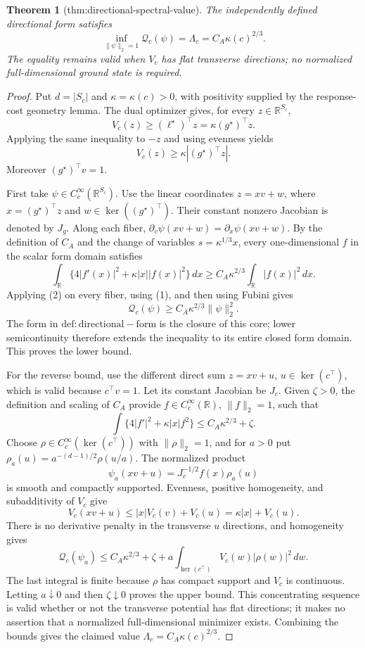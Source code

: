 \documentclass{article}
\newtheorem{theorem}{Theorem}
\begin{document}
\begin{theorem}[thm:directional-spectral-value]\label{thm:directional-spectral-value}
The independently defined directional form satisfies \[\inf_{\|\psi\|_2=1}\mathcal Q_c(\psi)=\Lambda_c=C_A\kappa(c)^{2/3}.\] The equality remains valid when \(V_c\) has flat transverse directions; no normalized full-dimensional ground state is required.
\end{theorem}
\begin{proof}
Put \(d=|S_c|\) and \(\kappa=\kappa(c)>0\), with positivity supplied by the response-cost geometry lemma.  The dual optimizer gives, for every \(z\in\mathbb R^{S_c}\),
\[
V_c(z)\ge (\ell^\star)^\top z=\kappa(g^\star)^\top z.
\]
Applying the same inequality to \(-z\) and using evenness yields
\[
V_c(z)\ge\kappa|(g^\star)^\top z|. \tag{1}
\]
Moreover \((g^\star)^\top v=1\).

First take \(\psi\in C_c^\infty(\mathbb R^{S_c})\).  Use the linear coordinates
\(z=xv+w\), where \(x=(g^\star)^\top z\) and \(w\in\ker((g^\star)^\top)\).  Their constant nonzero Jacobian is denoted by \(J_g\).  Along each fiber, \(\partial_v\psi(xv+w)=\partial_x\psi(xv+w)\).  By the definition of \(C_A\) and the change of variables \(s=\kappa^{1/3}x\), every one-dimensional \(f\) in the scalar form domain satisfies
\[
\int_{\mathbb R}\{4|f'(x)|^2+\kappa|x||f(x)|^2\}\,dx
\ge C_A\kappa^{2/3}\int_{\mathbb R}|f(x)|^2\,dx. \tag{2}
\]
Applying (2) on every fiber, using (1), and then using Fubini gives
\[
\mathcal Q_c(\psi)
\ge C_A\kappa^{2/3}\|\psi\|_2^2.
\]
The form in \(\mathrm{def:directional-form}\) is the closure of this core; lower semicontinuity therefore extends the inequality to its entire closed form domain.  This proves the lower bound.

For the reverse bound, use the different direct sum
\(z=xv+u\), \(u\in\ker(c^\top)\), which is valid because \(c^\top v=1\).  Let its constant Jacobian be \(J_c\).  Given \(\zeta>0\), the definition and scaling of \(C_A\) provide \(f\in C_c^\infty(\mathbb R)\), \(\|f\|_2=1\), such that
\[
\int\{4|f'|^2+\kappa|x|f^2\}\le C_A\kappa^{2/3}+\zeta.
\]
Choose \(\rho\in C_c^\infty(\ker(c^\top))\) with \(\|\rho\|_2=1\), and for \(a>0\) put
\(\rho_a(u)=a^{-(d-1)/2}\rho(u/a)\).  The normalized product
\[
\psi_a(xv+u)=J_c^{-1/2}f(x)\rho_a(u)
\]
is smooth and compactly supported.  Evenness, positive homogeneity, and subadditivity of \(V_c\) give
\[
V_c(xv+u)\le |x|V_c(v)+V_c(u)=\kappa|x|+V_c(u).
\]
There is no derivative penalty in the transverse \(u\) directions, and homogeneity gives
\[
\mathcal Q_c(\psi_a)
\le C_A\kappa^{2/3}+\zeta
+a\int_{\ker(c^\top)}V_c(w)|\rho(w)|^2\,dw.
\]
The last integral is finite because \(\rho\) has compact support and \(V_c\) is continuous.  Letting \(a\downarrow0\) and then \(\zeta\downarrow0\) proves the upper bound.  This concentrating sequence is valid whether or not the transverse potential has flat directions; it makes no assertion that a normalized full-dimensional minimizer exists.  Combining the bounds gives the claimed value \(\Lambda_c=C_A\kappa(c)^{2/3}\).
\end{proof}
\end{document}
